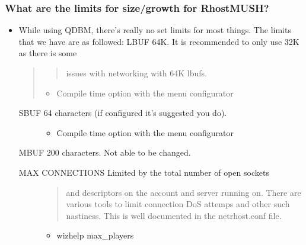 \documentclass[letterpaper,10pt,english]{sphinxmanual}
\begin{document}
\subsubsection{What are the limits for size/growth for RhostMUSH?}
\label{\detokenize{features:what-are-the-limits-for-size-growth-for-rhostmush}}\begin{itemize}
\item {} 
\sphinxAtStartPar
While using QDBM, there’s really no set limits for most things.
The limits that we have are as followed:
LBUF \sphinxhyphen{} 64K.  It is recommended to only use 32K as there is some
\begin{quote}
\begin{quote}

\sphinxAtStartPar
issues with networking with 64K lbufs.
\end{quote}
\begin{itemize}
\item {} 
\sphinxAtStartPar
Compile time option with the menu configurator

\end{itemize}
\end{quote}
\begin{description}
\item[{SBUF \sphinxhyphen{} 64 characters (if configured \textendash{} it’s suggested you do).}] \leavevmode\begin{itemize}
\item {} 
\sphinxAtStartPar
Compile time option with the menu configurator

\end{itemize}

\end{description}

\sphinxAtStartPar
MBUF \sphinxhyphen{} 200 characters.  Not able to be changed.
\begin{description}
\item[{MAX CONNECTIONS \sphinxhyphen{} Limited by the total number of open sockets}] \leavevmode\begin{quote}

\sphinxAtStartPar
and descriptors on the account and server running on.
There are various tools to limit connection DoS attemps
and other such nastiness.  This is well documented in
the netrhost.conf file.
\end{quote}
\begin{itemize}
\item {} 
\sphinxAtStartPar
wizhelp max\_players


\end{itemize}
\end{description}
\end{itemize}
\end{document}

